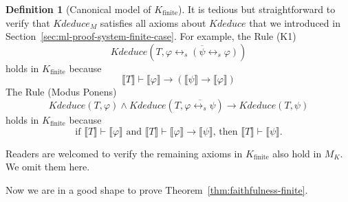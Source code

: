 \documentclass[UTF8,11pt]{article}
\newcounter{thmcounter}
\theoremstyle{plain}
\theoremstyle{definition}
\newtheorem{definition} [thmcounter]{Definition}
\theoremstyle{remark}
\newcommand{\Bracket}[1]{\llbracket#1\rrbracket}
\newcommand{\Kfinite}{{K_\text{finite}}}
\newcommand{\Kdeduce}{\mathit{Kdeduce}}
\begin{document}
\begin{definition}[Canonical model of $\Kfinite$]
    It is tedious but straightforward to verify that $\Kdeduce_M$ satisfies all axioms about $\Kdeduce$ that we introduced in Section~\cref{sec:ml-proof-system-finite-case}.
    For example, the Rule (K1)
    \begin{equation*}
    \Kdeduce(T, \overline{\varphi \leftrightarrow_s (\psi \leftrightarrow_s \varphi)})
    \end{equation*}
    holds in $\Kfinite$ because
    $$\Bracket{T} \vdash \Bracket{\varphi} \to (\Bracket{\psi} \to \Bracket{\varphi})$$
    The Rule (Modus Ponens)
    \begin{equation*}
    \Kdeduce(T, \varphi) \wedge \Kdeduce(T, \overline{\varphi \leftrightarrow_s \psi}) \to 
    \Kdeduce(T, \psi)
    \end{equation*}
    holds in $\Kfinite$ because
    $$\text{if $\Bracket{T} \vdash \Bracket{\varphi}$ and $\Bracket{T} \vdash \Bracket{\varphi} \to \Bracket{\psi}$, then $\Bracket{T} \vdash \Bracket{\psi}$}.$$
    
    Readers are welcomed to verify the remaining axioms in $\Kfinite$ also hold in $M_K$.
    We omit them here.
    

\end{definition}


Now we are in a good shape to prove Theorem~\ref{thm:faithfulness-finite}.
\end{document}

